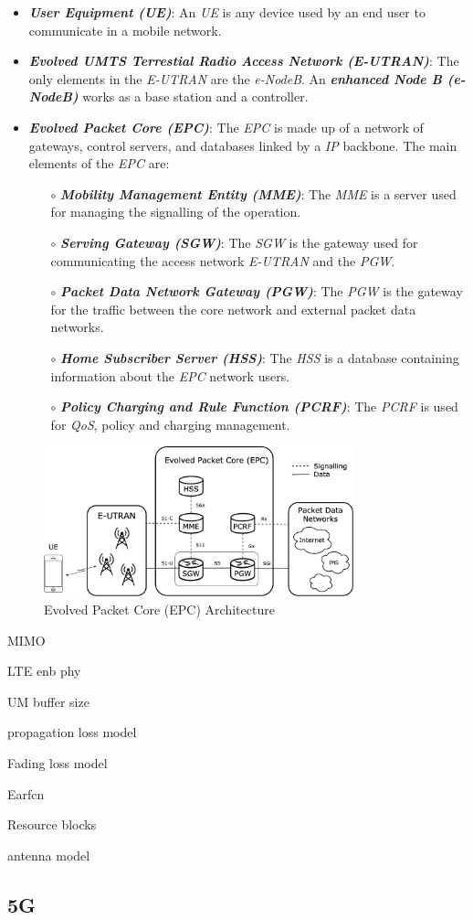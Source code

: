 \begin{itemize}
  \item \textbf{\textit{User Equipment (UE)}}: An \textit{UE} is any device used by an end user
  to communicate in a mobile network.
  \item \textbf{\textit{Evolved UMTS Terrestial Radio Access Network (E-UTRAN)}}: The only elements
  in the \textit{E-UTRAN} are the \textit{e-NodeB}. An \textit{\textbf{enhanced Node B (e-NodeB)}} works as a base station
  and a controller.
  \item \textbf{\textit{Evolved Packet Core (EPC)}}: The \textit{EPC} is made up of a network of gateways, 
  control servers, and databases linked by a \textit{IP} backbone. The main elements of the \textit{EPC}
  are:
  \begin{itemize}
    \item[$\circ$] \textit{\textbf{Mobility Management Entity (MME)}}: The \textit{MME} is a server 
    used for managing the signalling of the operation. 
    \item[$\circ$] \textit{\textbf{Serving Gateway (SGW)}}: The \textit{SGW} is the gateway used for
    communicating the access network \textit{E-UTRAN} and the \textit{PGW}.
    \item[$\circ$] \textit{\textbf{Packet Data Network Gateway (PGW)}}: The \textit{PGW} is the gateway
    for the traffic between the core network and external packet data networks. 
    \item[$\circ$] \textit{\textbf{Home Subscriber Server (HSS)}}: The \textit{HSS} is a database 
    containing information about the \textit{EPC} network users.  
    \item[$\circ$] \textit{\textbf{Policy Charging and Rule Function (PCRF)}}: The \textit{PCRF} is used
    for \textit{QoS}, policy and charging management. 
  \end{itemize}
\end{itemize}

\begin{figure}[h]
  \centering
  \includegraphics[width=0.8\textwidth]{img/epc.png}
  \caption{Evolved Packet Core (EPC) Architecture}
  \label{fig:epc}
\end{figure}

MIMO

LTE enb phy

UM buffer size

propagation loss model

Fading loss model

Earfcn

Resource blocks


antenna model

\subsection{5G}
\label{sec:5G}


